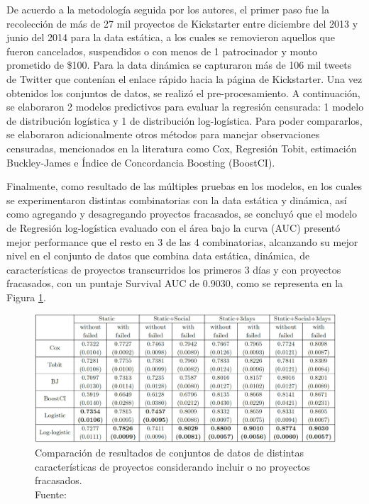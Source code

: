 De acuerdo a la metodología seguida por los autores, el primer paso fue la recolección de más de 27 mil proyectos de Kickstarter entre diciembre del 2013 y junio del 2014 para la data estática, a los cuales se removieron aquellos que fueron cancelados, suspendidos o con menos de 1 patrocinador y monto prometido de \$100. Para la data dinámica se capturaron más de 106 mil tweets de Twitter que contenían el enlace rápido hacia la página de Kickstarter. Una vez obtenidos los conjuntos de datos, se realizó el pre-procesamiento. A continuación, se elaboraron 2 modelos predictivos para evaluar la regresión censurada: 1 modelo de distribución logística y 1 de distribución log-logística. Para poder compararlos, se elaboraron adicionalmente otros métodos para manejar observaciones censuradas, mencionados en la literatura como Cox, Regresión Tobit, estimación Buckley-James e Índice de Concordancia Boosting (BoostCI).

Finalmente, como resultado de las múltiples pruebas en los modelos, en los cuales se experimentaron distintas combinatorias con la data estática y dinámica, así como agregando y desagregando proyectos fracasados, se concluyó que el modelo de Regresión log-logística evaluado con el área bajo la curva (AUC) presentó mejor performance que el resto en 3 de las 4 combinatorias, alcanzando su mejor nivel en el conjunto de datos que combina data estática, dinámica, de características de proyectos transcurridos los primeros 3 días y con proyectos fracasados, con un puntaje Survival AUC de 0.9030, como se representa en la Figura \ref{2:fig116}.

\begin{figure}[!ht]
	\begin{center}
		\includegraphics[width=1\textwidth]{2/figures/li2016.jpg}
		\caption[Comparación de resultados de conjuntos de datos de distintas características de proyectos considerando incluir o no proyectos fracasados]{Comparación de resultados de conjuntos de datos de distintas características de proyectos considerando incluir o no proyectos fracasados.\\
			Fuente: \cite{pr_li2016predcrowd}}
		\label{2:fig116}
	\end{center}
\end{figure}

